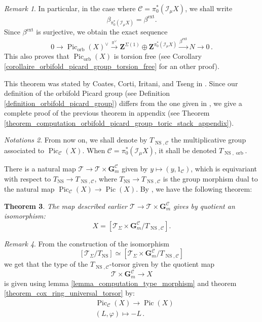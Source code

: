 \documentclass{proc-l}
\newcommand{\Z}{\mathbf{Z}}
\newcommand{\G}{\mathbf{G}}
\DeclareMathOperator{\Pic}{Pic}
\DeclareMathOperator{\NS}{NS}
\DeclareMathOperator{\orb}{orb}
\DeclareMathOperator{\ext}{ext}
\newcommand{\stackT}{\mathcal{T}}
\newcommand{\sheafI}{\mathcal{I}}
\newcommand{\twistsector}{\pi_0^*(\sheafI_{\mu} X)}
\newtheorem{theorem}{Theorem}[section]
\theoremstyle{definition}
\theoremstyle{remark}
\newtheorem{remark}[theorem]{Remark}
\newtheorem{Notations}[theorem]{Notations}
\numberwithin{equation}{section}
\begin{document}
\begin{remark}\label{remark_exact_sequence_dual_orbifold_picard_group}
    In particular, in the case where $\mathcal{C} = \twistsector$, we shall write $$\beta_{\twistsector} = \beta^{\ext} .$$Since $\beta^{\ext}$ is surjective, we obtain the exact sequence
\[
0 \longrightarrow \Pic_{\orb}(X)^{\vee} \xrightarrow{\pi^{\vee}} \Z^{\Sigma(1)} \oplus \Z^{\twistsector} \xrightarrow{\beta^{\ext}} N \longrightarrow 0 \, .
\]This also proves that $\Pic_{\orb}(X)$ is torsion free (see Corollary \ref{corollaire_orbifold_picard_group_torsion_free} for an other proof). 

\end{remark}

This theorem was stated by Coates, Corti, Iritani, and Tseng in \cite[Proposition 21]{Coates_Corti_Iritani_Tseng_miror_theorem_toric_stack}. Since our definition of the orbifold Picard group (see Definition \ref{definition_orbifold_picard_group}) differs from the one given in \cite[Definition 15]{Coates_Corti_Iritani_Tseng_miror_theorem_toric_stack}, we give a complete proof of the previous theorem in appendix (see Theorem \ref{theorem_computation_orbifold_picard_group_toric_stack_appendix}).


\begin{Notations}
    From now on, we shall denote by $T_{\NS,\mathcal{C}}$ the multiplicative group associated to $\Pic_{\mathcal{C}}(X).$ When $\mathcal{C} = \twistsector$, it shall be denoted $T_{\NS,\orb}$.
\end{Notations}

There is a natural map $\stackT \rightarrow \stackT \times \G_m^{\mathcal{C}}$ given by $y \mapsto (y,1_{\mathcal{C}})$, which is equivariant with respect to $T_{\NS} \rightarrow T_{\NS,\mathcal{C}} $, where $T_{\NS} \rightarrow T_{\NS,\mathcal{C}} $ is the group morphism dual to the natural map $\Pic_{\mathcal{C}}(X) \rightarrow \Pic(X)$. By \cite[proposition 2.3]{Jiang2005TheOC}, we have the following theorem:

\begin{theorem}\label{theorem_extended_universal_torsor}
    The map described earlier $\stackT \rightarrow \stackT \times \G_m^{\mathcal{C}}$ gives by quotient an isomorphism:
    $$ X = [\stackT_{\Sigma} \times \G_m^{\mathcal{C}} / T_{\NS,\mathcal{C}} ].$$
\end{theorem}

\begin{remark}\label{remark_computation_type_extended_universal_torsor}
From the construction of the isomorphism
\[
[\stackT_{\Sigma} / T_{\NS}]
\simeq
[\stackT_{\Sigma} \times \G_m^{\mathcal{C}} / T_{\NS,\mathcal{C}}]
\]
we get that the type of the $T_{\NS,\mathcal{C}}$-torsor given by the quotient map
\[
\stackT \times \G_m^{\mathcal{C}} \rightarrow X
\]
is given using lemma \ref{lemma_computation_type_morphism} and theorem \ref{theorem_cox_ring_universal_torsor} by:
\begin{align*}
    &\Pic_{\mathcal{C}}(X) \longrightarrow \Pic(X) \\
    &(L,\varphi) \longmapsto - L \, .
\end{align*}
\end{remark}
\end{document}
